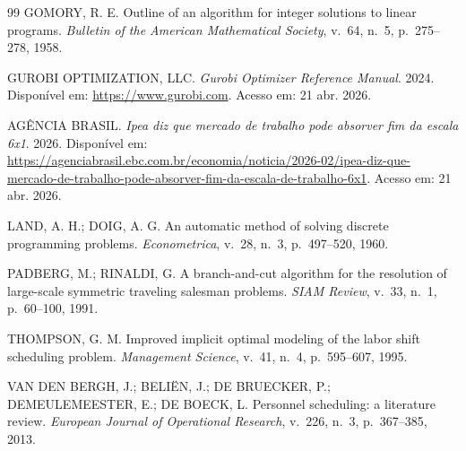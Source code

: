 \documentclass[12pt,a4paper]{article}
\begin{document}
\begin{thebibliography}{99}
 GOMORY, R. E. Outline of an algorithm for integer
solutions to linear programs. \emph{Bulletin of the American Mathematical
Society}, v.~64, n.~5, p.~275--278, 1958.

 GUROBI OPTIMIZATION, LLC. \emph{Gurobi Optimizer Reference
Manual}. 2024. Disponível em: \url{https://www.gurobi.com}. Acesso em: 21
abr. 2026.

 AGÊNCIA BRASIL. \emph{Ipea diz que mercado de trabalho pode
absorver fim da escala 6x1}. 2026. Disponível em:
\url{https://agenciabrasil.ebc.com.br/economia/noticia/2026-02/ipea-diz-que-mercado-de-trabalho-pode-absorver-fim-da-escala-de-trabalho-6x1}.
Acesso em: 21 abr. 2026.

 LAND, A. H.; DOIG, A. G. An automatic method of
solving discrete programming problems. \emph{Econometrica}, v.~28, n.~3,
p.~497--520, 1960.

 PADBERG, M.; RINALDI, G. A branch-and-cut algorithm for
the resolution of large-scale symmetric traveling salesman problems.
\emph{SIAM Review}, v.~33, n.~1, p.~60--100, 1991.

 THOMPSON, G. M. Improved implicit optimal modeling of
the labor shift scheduling problem. \emph{Management Science}, v.~41, n.~4,
p.~595--607, 1995.

 VAN DEN BERGH, J.; BELIËN, J.; DE BRUECKER, P.;
DEMEULEMEESTER, E.; DE BOECK, L. Personnel scheduling: a literature review.
\emph{European Journal of Operational Research}, v.~226, n.~3, p.~367--385,
2013.

\end{thebibliography}
\end{document}
